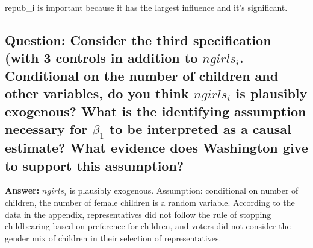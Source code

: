 \documentclass[
]{article}
\begin{document}
repub\_i is important because it has the largest influence and it's
significant.

\clearpage

\hypertarget{question-consider-the-third-specification-with-3-controls-in-addition-to-ngirls_i.-conditional-on-the-number-of-children-and-other-variables-do-you-think-ngirls_i-is-plausibly-exogenous-what-is-the-identifying-assumption-necessary-for-beta_1-to-be-interpreted-as-a-causal-estimate-what-evidence-does-washington-give-to-support-this-assumption}{%
\subsection{\texorpdfstring{Question: Consider the third specification
(with 3 controls in addition to \(ngirls_i\). Conditional on the number
of children and other variables, do you think \(ngirls_i\) is plausibly
exogenous? What is the identifying assumption necessary for \(\beta_1\)
to be interpreted as a causal estimate? What evidence does Washington
give to support this
assumption?}{Question: Consider the third specification (with 3 controls in addition to ngirls\_i. Conditional on the number of children and other variables, do you think ngirls\_i is plausibly exogenous? What is the identifying assumption necessary for \textbackslash beta\_1 to be interpreted as a causal estimate? What evidence does Washington give to support this assumption?}}\label{question-consider-the-third-specification-with-3-controls-in-addition-to-ngirls_i.-conditional-on-the-number-of-children-and-other-variables-do-you-think-ngirls_i-is-plausibly-exogenous-what-is-the-identifying-assumption-necessary-for-beta_1-to-be-interpreted-as-a-causal-estimate-what-evidence-does-washington-give-to-support-this-assumption}}

\textbf{Answer:} \(ngirls_i\) is plausibly exogenous. Assumption:
conditional on number of children, the number of female children is a
random variable. According to the data in the appendix, representatives
did not follow the rule of stopping childbearing based on preference for
children, and voters did not consider the gender mix of children in
their selection of representatives.

\clearpage
\end{document}
